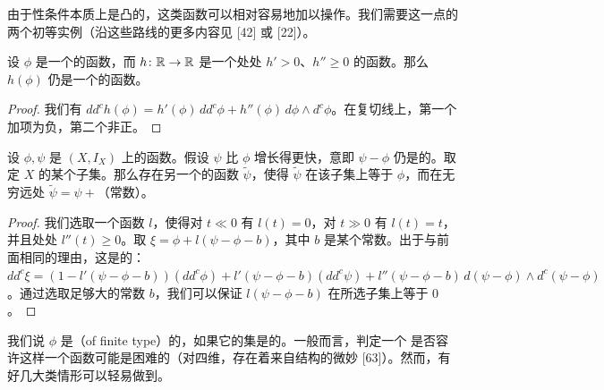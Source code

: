 由于\trPlurisubharmonic{}性条件本质上是凸的，这类函数可以相对容易地加以操作。我们需要这一点的两个初等实例（沿这些路线的更多内容见 [42] 或 [22]）。
\begin{lemma}\label{thm:plurisubharmonic-monotone-recomposition}
设 $\phi$ 是一个\trExhausting{}的\trPlurisubharmonic{}函数，而 $h\colon\mathbb{R}\to\mathbb{R}$ 是一个处处 $h'>0$、$h''\ge 0$ 的函数。那么 $h(\phi)$ 仍是一个\trExhausting{}的\trPlurisubharmonic{}函数。
\end{lemma}
\begin{proof}
我们有 $dd^c h(\phi)=h'(\phi)\,dd^c\phi+h''(\phi)\,d\phi\wedge d^c\phi$。在复切线上，第一个加项为负，第二个非正。
\end{proof}
\begin{lemma}\label{thm:plurisubharmonic-modification}
设 $\phi,\psi$ 是 $(X,I_X)$ 上的\trExhausting{}\trPlurisubharmonic{}函数。假设 $\psi$ 比 $\phi$ 增长得更快，意即 $\psi-\phi$ 仍是\trExhausting{}的。取定 $X$ 的某个\trCompact{}子集。那么存在另一个\trExhausting{}的\trPlurisubharmonic{}函数 $\tilde{\psi}$，使得 $\tilde{\psi}$ 在该\trCompact{}子集上等于 $\phi$，而在无穷远处 $\tilde{\psi}=\psi+$（常数）。
\end{lemma}
\begin{proof}
我们选取一个函数 $l$，使得对 $t\ll 0$ 有 $l(t)=0$，对 $t\gg 0$ 有 $l(t)=t$，并且处处 $l''(t)\ge 0$。取 $\xi=\phi+l(\psi-\phi-b)$，其中 $b$ 是某个常数。出于与前面相同的理由，这是\trPlurisubharmonic{}的：$dd^c\xi=(1-l'(\psi-\phi-b))(dd^c\phi)+l'(\psi-\phi-b)(dd^c\psi)+l''(\psi-\phi-b)\,d(\psi-\phi)\wedge d^c(\psi-\phi)$。通过选取足够大的常数 $b$，我们可以保证 $l(\psi-\phi-b)$ 在所选\trCompact{}子集上等于 $0$。
\end{proof}
我们说 $\phi$ 是\textbf{\trFiniteType}（of finite type）的，如果它的\trCriticalPoint{}集是\trCompact{}的。一般而言，判定一个 \trStein{}\trManifold{}是否容许这样一个函数可能是困难的（对四维\trManifold，存在着来自\trDifferential{}结构的微妙\trObstruction{} [63]）。然而，有好几大类情形可以轻易做到。
